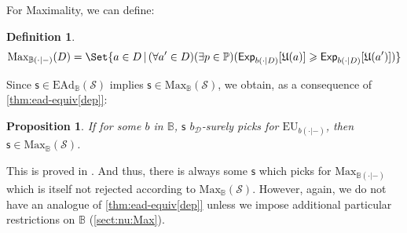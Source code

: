 \documentclass[a4paper,final]{article}
\newtheorem{definition}[theorem]{Definition}
\newtheorem{proposition}[theorem]{Proposition}
\renewcommand\P{\mathbb{P}} %
\newcommand\Exp{\mathsf{Exp}}
\newcommand\EU{\mathrm{EU}}
\newcommand\EAd{\mathrm{EAd}}
\newcommand\U{\mathfrak{U}} %
\newcommand\Maximality{\mathrm{Max}}
\newcommand{\Decs}{\mathcal{D}}
\renewcommand\S{\mathcal{S}}
\newcommand\s{\mathsf{s}}
\newcommand{\IB}{\mathbb{B}}
\newcommand{\IP}{\P}
\newcommand{\Strategies}{\S}
\newcommand\SetDelimiter[1][]{
	\nonscript\,#1\vert \allowbreak \nonscript\,\mathopen{}}
\providecommand\given{\SetDelimiter}
\renewcommand{\geq}{\geqslant}
\newenvironment{CCM rewritten}
{\begingroup\color{blue}} %
{\endgroup}              %
\begin{document}
For Maximality, we can define: 
\begin{definition}
	$$\Maximality_{\IB(\cdot|-)}(D) = \Set{a \in D \given (\forall a' \in D)(\exists p\in\IP)(\Exp_{b(\cdot|D)}[\U(a)]\geq\Exp_{b(\cdot|D)}[\U(a')])}
	$$\end{definition}
	Since $\s\in\EAd_\IB(\S)$ implies $\s\in\Maximality_\IB(\S)$, we obtain, as a consequence of \cref{thm:ead-equiv[dep]}:
	\begin{proposition}\label{thm:max-suff[dep]}
	If for some $b$ in $\IB$, $\s$ $b_\Decs$-surely picks for $\EU_{b(\cdot|-)}$, then $\s\in\Maximality_\IB(\Strategies)$. 
\end{proposition}This is proved in . And thus, there is always some $\s$ which picks for $\Maximality_{\IB(\cdot|-)}$ which is itself not rejected according to $\Maximality_\IB(\Strategies)$. However, again, we do not have %
an analogue of \cref{thm:ead-equiv[dep]} unless we impose additional particular restrictions on $\IB$ (\cref{sect:nu:Max}).
\end{document}

